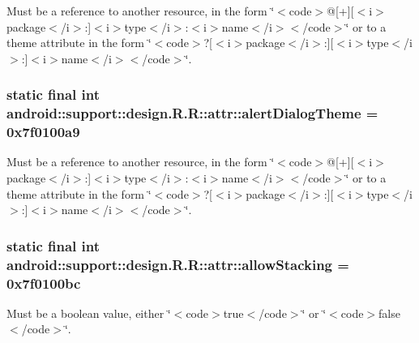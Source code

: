 Must be a reference to another resource, in the form \char`\"{}$<$code$>$@\mbox{[}+\mbox{]}\mbox{[}$<$i$>$package$<$/i$>$:\mbox{]}$<$i$>$type$<$/i$>$:$<$i$>$name$<$/i$>$$<$/code$>$\char`\"{} or to a theme attribute in the form \char`\"{}$<$code$>$?\mbox{[}$<$i$>$package$<$/i$>$:\mbox{]}\mbox{[}$<$i$>$type$<$/i$>$:\mbox{]}$<$i$>$name$<$/i$>$$<$/code$>$\char`\"{}. \hypertarget{classandroid_1_1support_1_1design_1_1_r_1_1attr_7a5b8cd2d1ad61dc3ca6fdf297f922c0}{
\subsubsection[{alertDialogTheme}]{\setlength{\rightskip}{0pt plus 5cm}static final int android::support::design.R.R::attr::alertDialogTheme = 0x7f0100a9}}
\label{classandroid_1_1support_1_1design_1_1_r_1_1attr_7a5b8cd2d1ad61dc3ca6fdf297f922c0}


Must be a reference to another resource, in the form \char`\"{}$<$code$>$@\mbox{[}+\mbox{]}\mbox{[}$<$i$>$package$<$/i$>$:\mbox{]}$<$i$>$type$<$/i$>$:$<$i$>$name$<$/i$>$$<$/code$>$\char`\"{} or to a theme attribute in the form \char`\"{}$<$code$>$?\mbox{[}$<$i$>$package$<$/i$>$:\mbox{]}\mbox{[}$<$i$>$type$<$/i$>$:\mbox{]}$<$i$>$name$<$/i$>$$<$/code$>$\char`\"{}. \hypertarget{classandroid_1_1support_1_1design_1_1_r_1_1attr_0d43e40c22589ae4c4d315a05a8c4567}{
\subsubsection[{allowStacking}]{\setlength{\rightskip}{0pt plus 5cm}static final int android::support::design.R.R::attr::allowStacking = 0x7f0100bc}}
\label{classandroid_1_1support_1_1design_1_1_r_1_1attr_0d43e40c22589ae4c4d315a05a8c4567}


Must be a boolean value, either \char`\"{}$<$code$>$true$<$/code$>$\char`\"{} or \char`\"{}$<$code$>$false$<$/code$>$\char`\"{}. 

